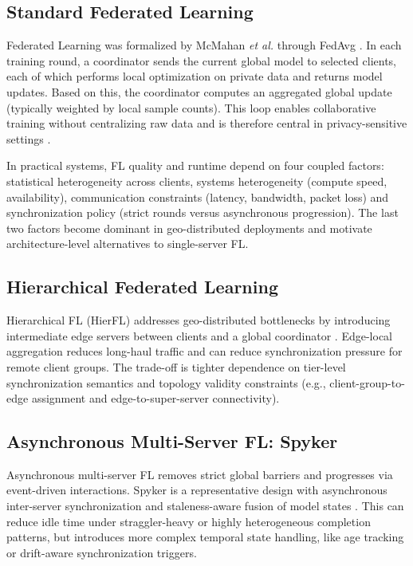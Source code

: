 \documentclass[conference]{IEEEtran}
\begin{document}
\subsection{Standard Federated Learning}
Federated Learning was formalized by McMahan \textit{et al.} through FedAvg \cite{mcmahan2017}. In each training round, a coordinator sends the current global model to selected clients, each of which performs local optimization on private data and returns model updates. Based on this, the coordinator computes an aggregated global update (typically weighted by local sample counts). This loop enables collaborative training without centralizing raw data and is therefore central in privacy-sensitive settings \cite{kairouz2021}.

In practical systems, FL quality and runtime depend on four coupled factors: statistical heterogeneity across clients, systems heterogeneity (compute speed, availability), communication constraints (latency, bandwidth, packet loss) and synchronization policy (strict rounds versus asynchronous progression). The last two factors become dominant in geo-distributed deployments and motivate architecture-level alternatives to single-server FL.

\subsection{Hierarchical Federated Learning}
Hierarchical FL (HierFL) addresses geo-distributed bottlenecks by introducing intermediate edge servers between clients and a global coordinator \cite{abad2020}. Edge-local aggregation reduces long-haul traffic and can reduce synchronization pressure for remote client groups. The trade-off is tighter dependence on tier-level synchronization semantics and topology validity constraints (e.g., client-group-to-edge assignment and edge-to-super-server connectivity).

\subsection{Asynchronous Multi-Server FL: Spyker}
Asynchronous multi-server FL removes strict global barriers and progresses via event-driven interactions. Spyker is a representative design with asynchronous inter-server synchronization and staleness-aware fusion of model states \cite{zuo2024}. This can reduce idle time under straggler-heavy or highly heterogeneous completion patterns, but introduces more complex temporal state handling, like age tracking or drift-aware synchronization triggers.
\end{document}
